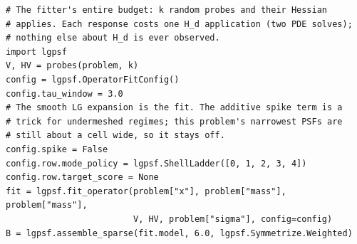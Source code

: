 \begin{verbatim}
# The fitter's entire budget: k random probes and their Hessian
# applies. Each response costs one H_d application (two PDE solves);
# nothing else about H_d is ever observed.
import lgpsf
V, HV = probes(problem, k)
config = lgpsf.OperatorFitConfig()
config.tau_window = 3.0
# The smooth LG expansion is the fit. The additive spike term is a
# trick for undermeshed regimes; this problem's narrowest PSFs are
# still about a cell wide, so it stays off.
config.spike = False
config.row.mode_policy = lgpsf.ShellLadder([0, 1, 2, 3, 4])
config.row.target_score = None
fit = lgpsf.fit_operator(problem["x"], problem["mass"], problem["mass"],
                         V, HV, problem["sigma"], config=config)
B = lgpsf.assemble_sparse(fit.model, 6.0, lgpsf.Symmetrize.Weighted)
\end{verbatim}
